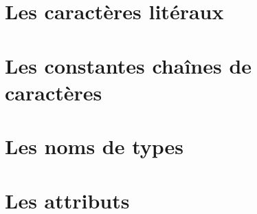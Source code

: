 \section{Les caractères litéraux}




\section{Les constantes chaînes de caractères}




\section{Les noms de types}





\section{Les attributs}



